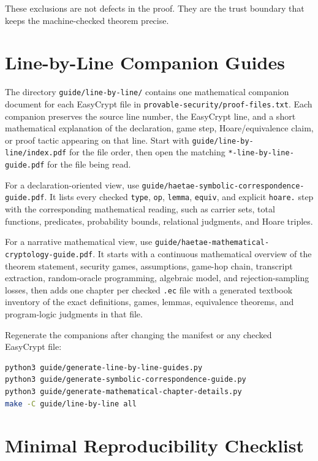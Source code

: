 \documentclass[11pt]{article}
\newcommand{\file}[1]{\nolinkurl{#1}}
\newcommand{\ec}[1]{\nolinkurl{#1}}
\begin{document}
These exclusions are not defects in the proof.  They are the trust boundary that
keeps the machine-checked theorem precise.

\section{Line-by-Line Companion Guides}

The directory \file{guide/line-by-line/} contains one mathematical companion
document for each EasyCrypt file in \file{provable-security/proof-files.txt}.
Each companion preserves the source line number, the EasyCrypt line, and a
short mathematical explanation of the declaration, game step, Hoare/equivalence
claim, or proof tactic appearing on that line.  Start with
\file{guide/line-by-line/index.pdf} for the file order, then open the matching
\file{*-line-by-line-guide.pdf} for the file being read.

For a declaration-oriented view, use
\file{guide/haetae-symbolic-correspondence-guide.pdf}.  It lists every checked
\ec{type}, \ec{op}, \ec{lemma}, \ec{equiv}, and explicit \ec{hoare.} step with
the corresponding mathematical reading, such as carrier sets, total functions,
predicates, probability bounds, relational judgments, and Hoare triples.

For a narrative mathematical view, use
\file{guide/haetae-mathematical-cryptology-guide.pdf}.  It starts with a
continuous mathematical overview of the theorem statement, security games,
assumptions, game-hop chain, transcript extraction, random-oracle programming,
algebraic model, and rejection-sampling losses, then adds one chapter per
checked \file{.ec} file with a generated textbook inventory of the exact
definitions, games, lemmas, equivalence theorems, and program-logic judgments
in that file.

Regenerate the companions after changing the manifest or any checked
EasyCrypt file:

\begin{lstlisting}[language=bash]
python3 guide/generate-line-by-line-guides.py
python3 guide/generate-symbolic-correspondence-guide.py
python3 guide/generate-mathematical-chapter-details.py
make -C guide/line-by-line all
\end{lstlisting}

\section{Minimal Reproducibility Checklist}
\end{document}
